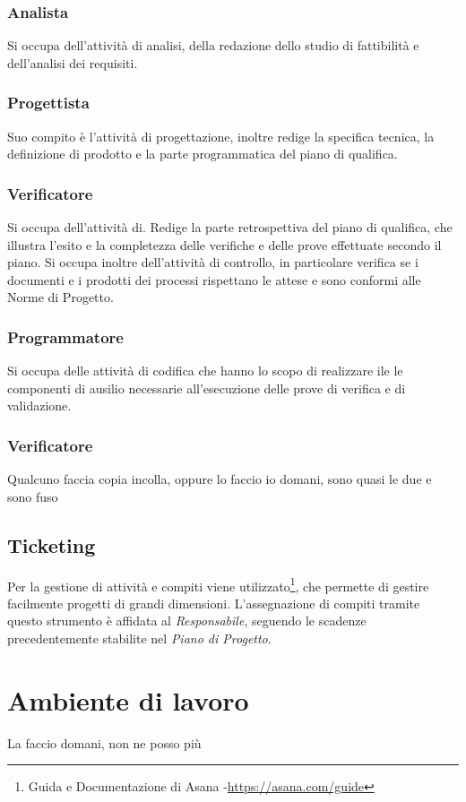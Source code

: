 \subsubsection{Analista} Si occupa dell'attività di analisi, della redazione dello studio di fattibilità e dell'analisi dei requisiti.
\subsubsection{Progettista} Suo compito è l'attività di progettazione, inoltre redige la specifica tecnica, la definizione di prodotto e la parte programmatica del piano di qualifica. 
\subsubsection{Verificatore} Si occupa dell'attività di. Redige la parte retrospettiva del piano di qualifica, che illustra l'esito e la completezza delle verifiche e delle prove effettuate secondo il piano. Si occupa  inoltre dell'attività di controllo, in particolare verifica se i documenti e i prodotti dei processi rispettano le attese e sono conformi alle Norme di Progetto.
\subsubsection{Programmatore} Si occupa delle attività di codifica che hanno lo scopo di realizzare ile le componenti di ausilio necessarie all'esecuzione delle prove di verifica e di validazione. 
\subsubsection{Verificatore}
Qualcuno faccia copia incolla, oppure lo faccio io domani, sono quasi le due e sono fuso

\subsection{Ticketing}
Per la gestione di attività e compiti viene utilizzato\footnote{Guida e Documentazione di Asana -\url{https://asana.com/guide}}, che permette di gestire facilmente progetti di grandi dimensioni.
L'assegnazione di compiti tramite questo strumento è affidata al \textit{Responsabile}, seguendo le scadenze precedentemente stabilite nel \textit{Piano di Progetto}.

\section{Ambiente di lavoro}
La faccio domani, non ne posso più

